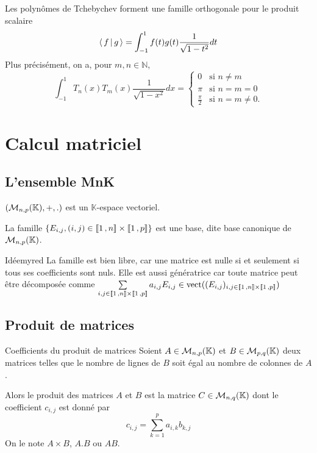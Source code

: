     \begin{prop}{}{}
        Les polynômes de Tchebychev forment une famille orthogonale pour le produit scalaire 
        \[ \left<\,f\,\middle|\,g\,\right> = \int_{-1}^{1} f(t)g(t) \frac{1}{\sqrt{1-t^2}} dt \]
        Plus précisément, on a, pour $m,n \in \mathbb{N}$,
       \[ \int_{-1}^1 T_n(x)T_m(x)\frac 1{\sqrt{1-x^2}}dx=
    \left\{
	\begin{array}{cl}
	0 &\text{si } n \neq m \\
	\pi &\text{si }n = m = 0 \\
	\frac{\pi}2 &\text{si } n = m \neq 0.
    \end{array}
    \right. \]
    \end{prop}

\newpage

\section{Calcul matriciel}

\subsection{L’ensemble MnK}

    \begin{theo}{}{}
        $(\mathcal{M}_{n,p}(\mathbb{K}),+,.)$ est un $\mathbb{K}$-espace vectoriel.
    \end{theo}

    \begin{theo}{}{}
        La famille $\{ E_{i,j}, (i,j) \in \left\llbracket 1 \, , n \right\rrbracket \times \left\llbracket 1 \, , p \right\rrbracket \}$ est une base, dite base canonique de $\mathcal{M}_{n,p}(\mathbb{K})$.
    \end{theo}

    \begin{demo}{Idée}{myred}
        La famille est bien libre, car une matrice est nulle si et seulement si tous ses coefficients sont nuls. Elle est aussi génératrice car toute matrice peut être décomposée comme $\sum\limits_{i,j \in \left\llbracket 1 \, , n \right\rrbracket \times \left\llbracket 1 \, , p \right\rrbracket} a_{i,j}E_{i,j} \in \operatorname{vect}((E_{i,j})_{i,j \in \left\llbracket 1 \, , n \right\rrbracket \times \left\llbracket 1 \, , p \right\rrbracket})$
    \end{demo}

\subsection{Produit de matrices}

    \begin{defi}{Coefficients du produit de matrices}{}
        Soient $A \in \mathcal{M}_{n,p}(\mathbb{K})$ et $B \in \mathcal{M}_{p,q}(\mathbb{K})$ deux matrices telles que le nombre de lignes de $B$ soit égal au nombre de colonnes de $A$.

        Alors le produit des matrices $A$ et $B$ est la matrice $C \in \mathcal{M}_{n,q}(\mathbb{K})$ dont le coefficient $c_{i,j}$ est donné par 
        \[ c_{i,j} = \sum\limits_{k=1}^p a_{i,k} b_{k,j} \]
        On le note $A \times B$, $A.B$ ou $AB$.
    \end{defi}

